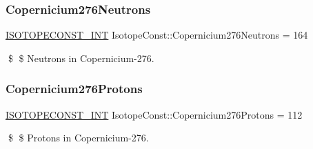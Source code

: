 \subsubsection{\texorpdfstring{Copernicium276\+Neutrons}{Copernicium276Neutrons}}
{\footnotesize\ttfamily \mbox{\hyperlink{group___isotope_const-_macros_ga5f18360b3e99483a35c32d789e62621c}{I\+S\+O\+T\+O\+P\+E\+C\+O\+N\+S\+T\+\_\+\+I\+NT}} Isotope\+Const\+::\+Copernicium276\+Neutrons = 164}

\$ \$ Neutrons in Copernicium-\/276. \mbox{\label{group___isotope_const-_copernicium-_cn276_ga2774d389eaddfea3848cb1e6d8438a6d}} 
\subsubsection{\texorpdfstring{Copernicium276\+Protons}{Copernicium276Protons}}
{\footnotesize\ttfamily \mbox{\hyperlink{group___isotope_const-_macros_ga5f18360b3e99483a35c32d789e62621c}{I\+S\+O\+T\+O\+P\+E\+C\+O\+N\+S\+T\+\_\+\+I\+NT}} Isotope\+Const\+::\+Copernicium276\+Protons = 112}

\$ \$ Protons in Copernicium-\/276. 